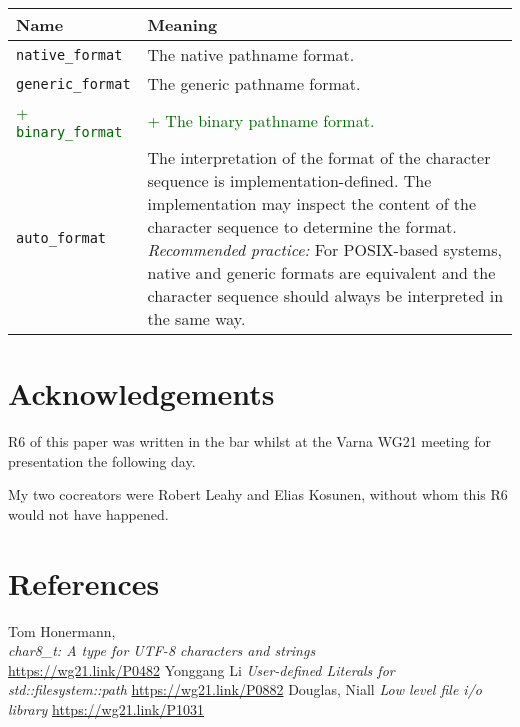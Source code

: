 \documentclass[11pt]{article}
\newcommand{\code}[2][cpp]{\lstinline[language=#1,basicstyle=\small\ttfamily]{#2}}
\newcommand{\tsreplace}[3]{\textcolor{red}{\sout{#1}}#2\textcolor{darkgreen}{#3}}
\begin{document}
\begin{center}
\begin{tabular}{|p{3cm} p{12cm}|}
\hline
\bf{Name} & \bf{Meaning}\\
\hline
\texttt{native\_format} & The native pathname format.\\
\texttt{generic\_format} & The generic pathname format.\\
\color{darkgreen}
\tsreplace{}{}{+ \code{binary_format}} & \tsreplace{}{}{+ The binary pathname format.}\\
\color{black}
\texttt{auto\_format} &
The interpretation of the format of the character sequence is
implementation-defined.
The implementation may inspect the content of the character sequence to determine the format.
\emph{Recommended practice:} For POSIX-based systems, native and generic formats are equivalent and the character sequence should always be interpreted in the same way.\\
\hline
\end{tabular}
\end{center}

\color{black}

\section{Acknowledgements}

R6 of this paper was written in the bar whilst at the Varna WG21 meeting
for presentation the following day.

My two cocreators were Robert Leahy and Elias Kosunen, without whom this
R6 would not have happened.

\section{References}
\let\oldsection=\section
\renewcommand{\section}[2]{}%
\begin{thebibliography}{9}
    Tom Honermann,\\
    \emph{char8\_t: A type for UTF-8 characters and strings}\\
    \url{https://wg21.link/P0482}
    Yonggang Li\newline
    \emph{User-defined Literals for std::filesystem::path}\newline
    \url{https://wg21.link/P0882}
    Douglas, Niall\newline
    \emph{Low level file i/o library}\newline
    \url{https://wg21.link/P1031}
\end{thebibliography}
\let\section=\oldsection
\end{document}
